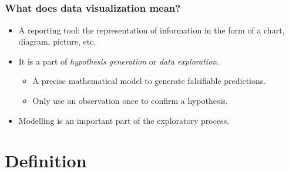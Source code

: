 \documentclass[11pt]{beamer}
\begin{document}
	\begin{frame}
		\section[]{}
		\frametitle{\bfseries What does data visualization mean?}
		
		\begin{itemize}
			\item A reporting tool: the representation of information in the form of a chart, diagram, picture, etc.
			\item It is a part of \textit{hypothesis generation} or \textit{data exploration}. 
			\begin{itemize}
				\item A precise mathematical model to generate falsifiable predictions.
				\item Only use an observation once to confirm a hypothesis.
			\end{itemize}
		\item Modelling is an important part of the exploratory process.
		\end{itemize}

	\end{frame}
\section{Definition}
\end{document}
